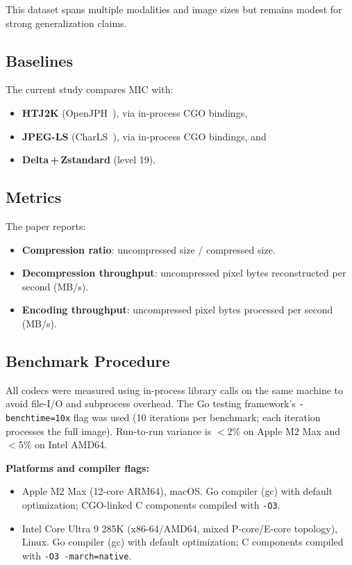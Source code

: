 \documentclass[journal]{IEEEtran}
\begin{document}
This dataset spans multiple modalities and image sizes but remains modest for
strong generalization claims.

\subsection{Baselines}

The current study compares MIC with:
\begin{itemize}
  \item \textbf{HTJ2K} (OpenJPH~\cite{openjph}), via in-process CGO bindings,
  \item \textbf{JPEG-LS} (CharLS~\cite{charls}), via in-process CGO bindings,
  and
  \item \textbf{Delta\,+\,Zstandard} (level 19).
\end{itemize}

\subsection{Metrics}

The paper reports:
\begin{itemize}
  \item \textbf{Compression ratio}: uncompressed size / compressed size.
  \item \textbf{Decompression throughput}: uncompressed pixel bytes
  reconstructed per second (MB/s).
  \item \textbf{Encoding throughput}: uncompressed pixel bytes processed per
  second (MB/s).
\end{itemize}

\subsection{Benchmark Procedure}

All codecs were measured using in-process library calls on the same machine to
avoid file-I/O and subprocess overhead. The Go testing framework's
\texttt{-benchtime=10x} flag was used (10 iterations per benchmark; each
iteration processes the full image). Run-to-run variance is $<$2\% on Apple
M2 Max and $<$5\% on Intel AMD64.

\textbf{Platforms and compiler flags:}
\begin{itemize}
  \item Apple M2 Max (12-core ARM64), macOS. Go compiler (gc) with default
  optimization; CGO-linked C components compiled with \texttt{-O3}.
  \item Intel Core Ultra 9 285K (x86-64/AMD64, mixed P-core/E-core topology),
  Linux. Go compiler (gc) with default optimization; C components compiled
  with \texttt{-O3 -march=native}.
\end{itemize}
\end{document}
